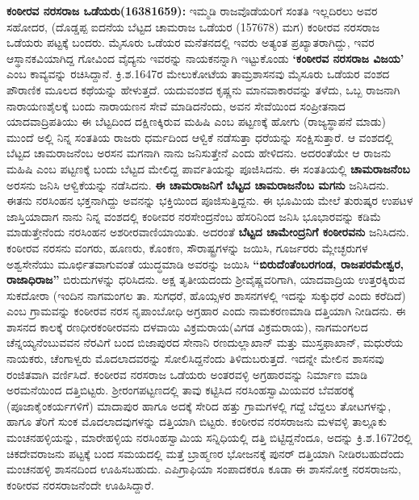 \textbf{ಕಂಠೀರವ ನರಸರಾಜ ಒಡೆಯರು(1638\general{\enginline{-}}1659):} ಇಮ್ಮಡಿ ರಾಜವೊಡೆಯರಿಗೆ ಸಂತತಿ ಇಲ್ಲದಿರಲು ಅವರ ಸಹೋದರ, (ದೊಡ್ಡಪ್ಪ ಐದನೆಯ ಬೆಟ್ಟದ ಚಾಮರಾಜ ಒಡೆಯರ (1576\enginline{-}78) ಮಗ) ಕಂಠೀರವ ನರಸರಾಜ ಒಡೆಯರು ಪಟ್ಟಕ್ಕೆ ಬಂದರು. ಮೈಸೂರು ಒಡೆಯರ ಮನೆತನದಲ್ಲಿ ಇವರು ಅತ್ಯಂತ ಪ್ರಖ್ಯಾತರಾಗಿದ್ದು, ಇವರ ಆಸ್ಥಾನಕವಿಯಾಗಿದ್ದ ಗೋವಿಂದ ವೈದ್ಯನು ಇವರನ್ನು ನಾಯಕನನ್ನಾಗಿ ಇಟ್ಟುಕೊಂಡು \textbf{‘ಕಂಠೀರವ ನರಸರಾಜ ವಿಜಯ’} ಎಂಬ ಕಾವ್ಯವನ್ನು ರಚಿಸಿದ್ದಾನೆ. ಕ್ರಿ.ಶ.1647ರ ಮೇಲುಕೋಟೆಯ ತಾಮ್ರಶಾಸನವು ಮೈಸೂರು ಒಡೆಯರ ವಂಶದ ಪೌರಾಣಿಕ ಮೂಲದ ಕಥೆಯನ್ನು ಹೇಳುತ್ತದೆ. ಯದುವಂಶದ ಕೃಷ್ಣನು ಮಾನವಾಕಾರವನ್ನು ತಳೆದು, ಒಬ್ಬ ರಾಜನಾಗಿ ನಾರಾಯಣಶೈಲಕ್ಕೆ ಬಂದು ನಾರಾಯಣನ ಸೇವೆ ಮಾಡಿದನೆಂದು, ಅವನ ಸೇವೆಯಿಂದ ಸಂಪ್ರೀತನಾದ ಯಾದವಾದ್ರಿಪತಿಯು ಈ ಬೆಟ್ಟದಿಂದ ದಕ್ಷಿಣಕ್ಕಿರುವ ಮಹಿಷಿ ಎಂಬ ಪಟ್ಟಣಕ್ಕೆ ಹೋಗು (ರಾಜ್ಯಸ್ಥಾಪನೆ ಮಾಡು) ಮುಂದೆ ಅಲ್ಲಿ ನಿನ್ನ ಸಂತತಿಯ ರಾಜರು ಧರ್ಮದಿಂದ ಆಳ್ವಿಕೆ ನಡೆಸುತ್ತಾ ಧರೆಯನ್ನು ಸಂಕ್ಷಿಸುತ್ತಾರೆ. ಆ ವಂಶದಲ್ಲಿ ಬೆಟ್ಟದ ಚಾಮರಾಜನೆಂಬ ಅರಸನ ಮಗನಾಗಿ ನಾನು ಜನಿಸುತ್ತೇನೆ ಎಂದು ಹೇಳಿದನು. ಅದರಂತೆಯೇ ಆ ರಾಜನು ಮಹಿಷಿ ಎಂಬ ಪಟ್ಟಣಕ್ಕೆ ಬಂದು ಬೆಟ್ಟದ ಮೇಲಿದ್ದ ಪಾರ್ವತಿಯನ್ನು ಪೂಜಿಸಿದನು. ಈ ಸಂತತಿಯಲ್ಲಿ \textbf{ಚಾಮರಾಜನೆಂಬ} ಅರಸನು ಜನಿಸಿ ಆಳ್ವಿಕೆಯನ್ನು ನಡೆಸಿದನು. \textbf{ಈ ಚಾಮರಾಜನಿಗೆ ಬೆಟ್ಟದ ಚಾಮರಾಜನೆಂಬ ಮಗನು} ಜನಿಸಿದನು. ಈತನು ನರಸಿಂಹನ ಭಕ್ತನಾಗಿದ್ದು ಅವನನ್ನು ಭಕ್ತಿಯಿಂದ ಪೂಜಿಸುತ್ತಿದ್ದನು. ಈ ಭೂಮಿಯ ಮೇಲೆ ತುರುಷ್ಕರ ಉಪಟಳ ಜಾಸ್ತಿಯಾದಾಗ ನಾನು ನಿನ್ನ ವಂಶದಲ್ಲಿ ಕಂಠೀವರ ನರಸೇಂದ್ರನೆಂಬ ಹೆಸರಿನಿಂದ ಜನಿಸಿ ಭೂಭಾರವನ್ನು ಕಡಿಮೆ ಮಾಡುತ್ತೇನೆಂದು ನರಸಿಂಹನ ಅಶರೀರವಾಣಿಯಾಯಿತು. ಅದರಂತೆ \textbf{ಬೆಟ್ಟದ ಚಾಮೇಂದ್ರನಿಗೆ ಕಂಠೀರವನು} ಜನಿಸಿದನು. ಕಂಠೀರವ ನರಸನು ವಂಗರು, ಹೂಣರು, ಕೊಂಕಣ, ಸೌರಾಷ್ಟ್ರಗಳನ್ನು ಜಯಿಸಿ, ಗೂರ್ಜರರು ಮ್ಲೇಚ್ಛರುಗಳ ಅಶ್ವಸೇನೆಯು ಮೂರ್ಛಿತವಾಗುವಂತೆ ಯುದ್ಧಮಾಡಿ ಅವರನ್ನು ಜಯಿಸಿ \textbf{“ಬಿರುದೆಂತೆಂಬರಗಂಡ, ರಾಜಪರಮೇಶ್ವರ, ರಾಜಾಧಿರಾಜ”} ಬಿರುದುಗಳನ್ನು ಧರಿಸಿದನು. ಅಕ್ಷ ತೃತೀಯದಂದು ಶ‍್ರೀವೈಷ್ಣವರಿಗಾಗಿ, ಯಾದವಾದ್ರಿಯ ಉತ್ತರಕ್ಕಿರುವ ಸುಕದೋರಾ (ಇಂದಿನ ನಾಗಮಂಗಲ ತಾ. ಸುಗಧರೆ, ಹೊಯ್ಸಳರ ಶಾಸನಗಳಲ್ಲಿ ಇದನ್ನು ಸುಕ್ಕುಧರೆ ಎಂದು ಕರೆದಿದೆ) ಎಂಬ ಗ್ರಾಮವನ್ನು ಕಂಠೀರವ ನರಸ ನೃಪಾಂಬೋಧಿ ಅಗ್ರಹಾರ ಎಂದು ನಾಮಕರಣಮಾಡಿ ದತ್ತಿಯಾಗಿ ನೀಡಿದನು. ಈ ಶಾಸನದ ಕಾಲಕ್ಕೆ ರಣಧೀರಕಂಠೀರವನು ದಳವಾಯಿ ವಿಕ್ರಮರಾಯ(ವಿಗಡ ವಿಕ್ರಮರಾಯ), ನಾಗಮಂಗಲದ ಚೆನ್ನಯ್ಯನೆಂಬುವವನ ನೆರವಿಗೆ ಬಂದ ಬಿಜಾಪುರದ ಸೇನಾನಿ ರಣದುಲ್ಲಾಖಾನ್​ ಮತ್ತು ಮುಸ್ತಫಾಖಾನ್​, ಮಧುರೆಯ ನಾಯಕರು, ಚೆಂಗಾಳ್ವರು ಮೊದಲಾದವರನ್ನು ಸೋಲಿಸಿದ್ದನೆಂದು ತಿಳಿದುಬರುತ್ತದೆ. ಇದನ್ನೇ ಮೇಲಿನ ಶಾಸನವು ರಂಜಿತವಾಗಿ ವರ್ಣಿಸಿದೆ. ಕಂಠೀರವ ನರಸರಾಜ ಒಡೆಯರು ಅಂತರವಳ್ಳಿ ಅಗ್ರಹಾರವನ್ನು ನಿರ್ಮಾಣ ಮಾಡಿ ಅರಮನೆಯಿಂದ ದತ್ತಿಬಿಟ್ಟರು. ಶ‍್ರೀರಂಗಪಟ್ಟಣದಲ್ಲಿ ತಾವು ಕಟ್ಟಿಸಿದ ನರಸಿಂಹಸ್ವಾಮಿಯವರ ಬೆವಹರಕ್ಕೆ (ಪೂಜಾಕೈಂಕರ್ಯ\-ಗಳಿಗೆ) ಮಾದಾಪುರ ಹಾಗೂ ಅದಕ್ಕೆ ಸೇರಿದ ಹತ್ತು ಗ್ರಾಮಗಳಲ್ಲಿ ಗದ್ದೆ ಬೆದ್ದಲು ತೋಟಗಳನ್ನು, ಹಾಗೂ ತೆರಿಗೆ ಸುಂಕ ಮೊದಲಾದವುಗಳನ್ನು ದತ್ತಿಯಾಗಿ ಬಿಟ್ಟರು. ಕಂಠೀರವ ನರಸರಾಜನು ಮಳವಳ್ಳಿ ತಾಲ್ಲೂಕು ಮಂಚನಹಳ್ಳಿಯನ್ನು, ಮಾರೇಹಳ್ಳಿಯ ನರಸಿಂಹಸ್ವಾಮಿಯ ಸನ್ನಿಧಿಯಲ್ಲಿ ದತ್ತಿ ಬಿಟ್ಟಿದ್ದನೆಂದೂ, ಅದನ್ನು ಕ್ರಿ.ಶ.1672ರಲ್ಲಿ ಚಿಕದೇವರಾಜನು ಪಟ್ಟಕ್ಕೆ ಬಂದ ಸಮಯದಲ್ಲಿ ಮತ್ತೆ ಬ್ರಾಹ್ಮಣರ ಭೋಜನಕ್ಕೆ ಪುನರ್​ ದತ್ತಿಯಾಗಿ ನೀಡಿರಬಹುದೆಂದು ಮಂಚನಹಳ್ಳಿ ಶಾಸನದಿಂದ ಊಹಿಸಬಹುದು. ಎಪಿಗ್ರಾಫಿಯಾ ಸಂಪಾದಕರೂ ಕೂಡಾ ಈ ಶಾಸನೋಕ್ತ ನರಸರಾಜನು, ಕಂಠೀರವ ನರಸರಾಜನೆಂದೇ ಊಹಿಸಿದ್ದಾರೆ.
